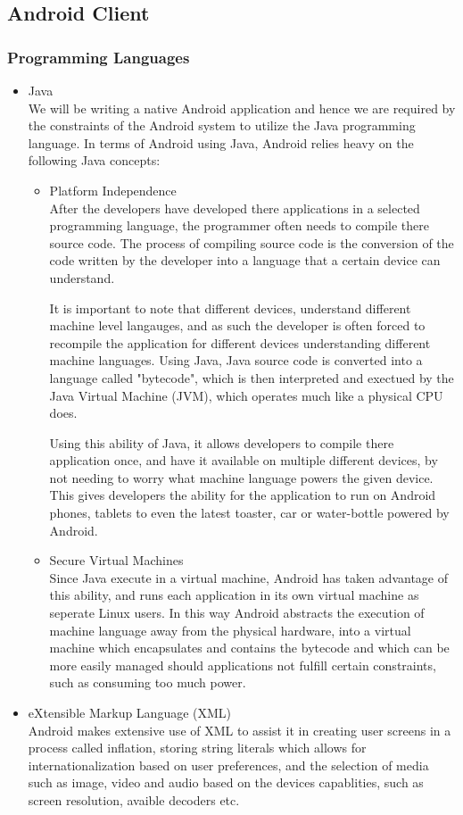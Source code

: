 \documentclass[a4paper,10pt]{article}
\begin{document}
\subsection{Android Client}
\subsubsection{Programming Languages}
	\begin{itemize}
		\item Java\\
			We will be writing a native Android application and hence we are required by the constraints of the Android system to utilize the Java programming language. In terms of Android using Java, Android relies heavy on the following Java concepts:
			\begin{itemize}
				\item Platform Independence\\
					After the developers have developed there applications in a selected programming language, the programmer often needs to compile there source code. The process of compiling source code is the conversion of the code written by the developer into a language that a certain device can understand. 
					
					It is important to note that different devices, understand different machine level langauges, and as such the developer is often forced to recompile the application for different devices understanding different machine languages. Using Java, Java source code is converted into a language called "bytecode", which is then interpreted and exectued by the Java Virtual Machine (JVM), which operates much like a physical CPU does.
					
					Using this ability of Java, it allows developers to compile there application once, and have it available on multiple different devices, by not needing to worry what machine language powers the given device. This gives developers the ability for the application to run on Android phones, tablets to even the latest toaster, car or water-bottle powered by Android.
					
				\item Secure Virtual Machines\\
					Since Java execute in a virtual machine, Android has taken advantage of this ability, and runs each application in its own virtual machine as seperate Linux users. In this way Android abstracts the execution of machine language away from the physical hardware, into a virtual machine which encapsulates and contains the bytecode and which can be more easily managed should applications not fulfill certain constraints, such as consuming too much power.
				\end{itemize}
		\item eXtensible Markup Language (XML)\\
			Android makes extensive use of XML to assist it in creating user screens in a process called inflation, storing string literals which allows for internationalization based on user preferences, and the selection of media such as image, video and audio based on the devices capablities, such as screen resolution, avaible decoders etc.
	\end{itemize}
	
\end{document}
